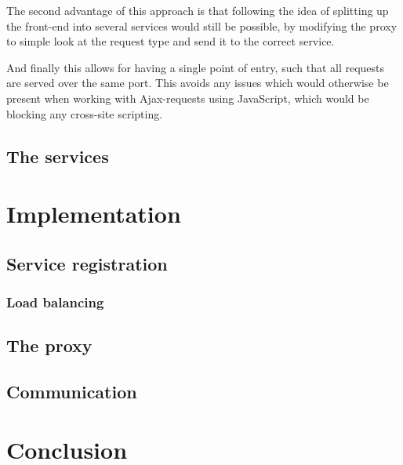 \documentclass[a4paper,11pt,oneside]{book}
\renewcommand{\newpage}{}
\begin{document}
The second advantage of this approach is that following the idea of splitting up the front-end into several services would still be possible, by modifying the proxy to simple look at the request type and send it to the correct service.

And finally this allows for having a single point of entry, such that all requests are served over the same port. This avoids any issues which would otherwise be present when working with Ajax-requests using JavaScript, which would be blocking any cross-site scripting. 


\section{The services}

%
\chapter{Implementation}

\section{Service registration}

\subsection*{Load balancing}

\section{The proxy}

\section{Communication}

%
%
\chapter{Conclusion}


\end{document}
